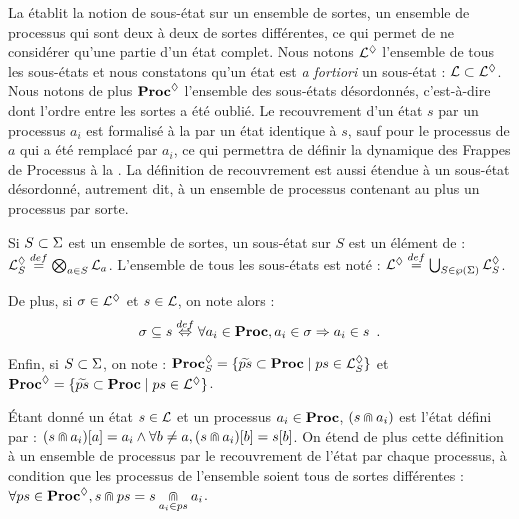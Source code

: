 La  établit la notion de sous-état sur un ensemble de sortes,
\cad un ensemble de processus qui sont deux à deux de sortes différentes,
ce qui permet de ne considérer qu'une partie d'un état complet.
Nous notons $\PHsubl$ l'ensemble de tous les sous-états et nous constatons qu'un
état est \textit{a fortiori} un sous-état : $\PHl \subset \PHsubl$.
Nous notons de plus $\PHsublset$ l'ensemble des sous-états désordonnés,
c'est-à-dire dont l'ordre entre les sortes a été oublié.
Le recouvrement d'un état $s$ par un processus $a_i$ est formalisé à la 
par un état identique à $s$, sauf pour le processus de $a$ qui a été remplacé par $a_i$,
ce qui permettra de définir la dynamique des Frappes de Processus %
à la .
La définition de recouvrement est aussi étendue à un sous-état désordonné,
autrement dit, à un ensemble de processus contenant au plus un processus par sorte.

\begin{definition}
  Si $S \subset \PHs$ est un ensemble de sortes, un sous-état sur $S$ est un élément de :
  $\PHsubl[\PHl]_S \DEF \bigtimes{a \in S} \PHl_a$.
  L'ensemble de tous les sous-états est noté :
  $\PHsubl[\PHl] \DEF \bigcup_{S \in\powerset(\PHs)} \PHsubl[\PHl]_S$.
  
  \noindent
  De plus, si $\mysigma \in \PHsubl[\PHl]$ et $s \in \PHl$, on note alors :
  \[\mysigma \subseteq s \EQDEF \forall a_i \in \Proc, a_i \in \mysigma \Rightarrow a_i \in s
    \enspace.\]
  
  \noindent
  Enfin, si $S \subset \PHs$, on note :
  $\PHsublset_S = \{ \toset{ps} \subset \Proc \mid ps \in \PHsubl_S \}$
  et
  $\PHsublset = \{ \toset{ps} \subset \Proc \mid ps \in \PHsubl \}$.
\end{definition}
%
\begin{definition}
  Étant donné un état $s \in \PHl$ et un processus $a_i \in \PHproc$,
  $(s \recouvre a_i)$ est l'état défini par :
  $\PHget{(s \recouvre a_i)}{a} = a_i \wedge \forall b \neq a, \PHget{(s \recouvre a_i)}{b} = \PHget{s}{b}$.
  On étend de plus cette définition à un ensemble de processus
  par le recouvrement de l'état par chaque processus,
  à condition que les processus de l'ensemble soient tous de sortes différentes :
  $\forall ps \in \PHsublset, s \recouvre ps = s \underset{a_i \in ps}{\recouvre} a_i$.
\end{definition}

